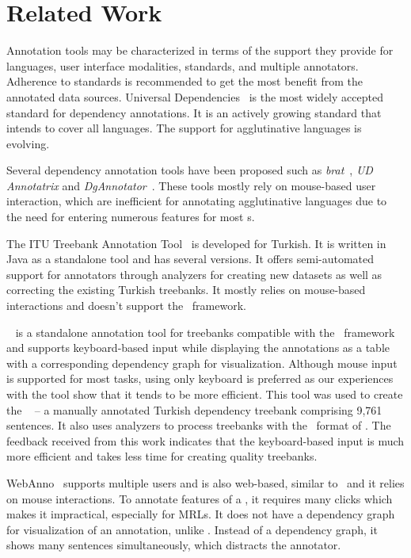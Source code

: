 \section{Related Work}
\label{sec:related}

Annotation tools may be characterized in terms of the support they provide for languages, user interface modalities, standards, and multiple annotators.
Adherence to standards is recommended to get the most benefit from the annotated data sources.
Universal Dependencies~\cite{UD} is the most widely accepted standard for dependency annotations.
It is an actively growing standard that intends to cover all languages.
The support for agglutinative languages is evolving.

Several dependency annotation tools have been proposed such as \textit{brat}~\cite{brat}, \textit{UD Annotatrix} and \textit{DgAnnotator}~\cite{UD-tools}.
These tools mostly rely on mouse-based user interaction, which are inefficient for annotating agglutinative languages due to the need for entering numerous features for most \form s.

The ITU Treebank Annotation Tool~\cite{pamay-etal-2015-annotation} is developed for Turkish.
It is written in Java as a standalone tool and has several versions.
It offers semi-automated support for annotators through analyzers for creating new datasets as well as correcting the existing Turkish treebanks.
It mostly relies on mouse-based interactions and doesn't support the \ud\ framework.

\boatvone~\cite{turk-etal-2019-turkish} is a standalone annotation tool for treebanks compatible with the \ud\ framework~\cite{UD} and supports keyboard-based input while displaying the annotations as a table with a corresponding dependency graph for visualization.
Although mouse input is supported for most tasks, using only keyboard is preferred as our experiences with the tool show that it tends to be more efficient.
This tool was used to create the \bountreebank~\cite{turk2021resources,UD-Boun-Treebank} -- a manually annotated Turkish dependency treebank comprising 9,761 sentences.
It also uses analyzers to process treebanks with the \conllu\ format of \ud.
The feedback received from this work indicates that the keyboard-based input is much more efficient and takes less time for creating quality treebanks.

WebAnno~\cite{webanno} supports multiple users and is also web-based, similar to \boatvtwo\ and it relies on mouse interactions.
To annotate features of a \form, it requires many clicks which makes it impractical, especially for MRLs.
It does not have a dependency graph for visualization of an annotation, unlike \boatvone. Instead of a dependency graph, it shows many sentences simultaneously, which distracts the annotator.

